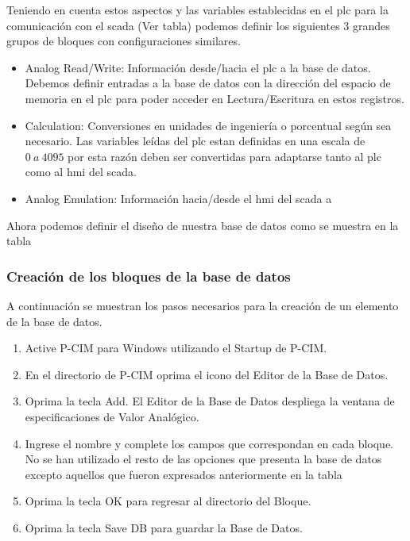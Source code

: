 Teniendo en cuenta estos aspectos y las variables establecidas en el \gls{plc} 
para la comunicación con el \gls{scada} (Ver tabla) podemos definir los siguientes 3 grandes grupos de bloques con 
configuraciones similares.
 
\begin{itemize}
 \item Analog Read/Write: Información desde/hacia el \gls{plc} a la base de 
  datos. Debemos definir entradas a la base de datos con la dirección del 
  espacio de memoria en el \gls{plc}   para poder acceder en Lectura/Escritura 
  en estos registros.
 \item Calculation:  Conversiones en unidades de ingeniería o porcentual 
  según sea necesario. Las variables leídas del \gls{plc} estan definidas en 
  una escala de $0~a~4095$ por esta razón deben ser convertidas para adaptarse 
  tanto al \gls{plc} como al \gls{hmi} del \gls{scada}.
 \item Analog Emulation: Información hacia/desde el \gls{hmi} del \gls{scada} a 

\end{itemize}
Ahora podemos definir el diseño de nuestra base de datos como se muestra en la tabla




\subsubsection{Creación de los bloques de la base de datos}

A continuación se muestran los pasos necesarios para la creación de un elemento de la base de datos.
\begin{enumerate}
 \item Active P-CIM para Windows utilizando el Startup de P-CIM.
 \item En el directorio de P-CIM oprima el icono del Editor de la Base de Datos.
 \item Oprima la tecla Add. El Editor de la Base de Datos despliega la ventana de
  especificaciones de Valor Analógico.
 \item  Ingrese el nombre y complete los campos que correspondan en cada bloque. No se han utilizado
 el resto de las opciones que presenta la base de datos excepto aquellos que fueron expresados anteriormente 
 en la tabla 
 \item Oprima la tecla OK para regresar al directorio del Bloque.
 \item Oprima la tecla Save DB para guardar la Base de Datos.
\end{enumerate}

